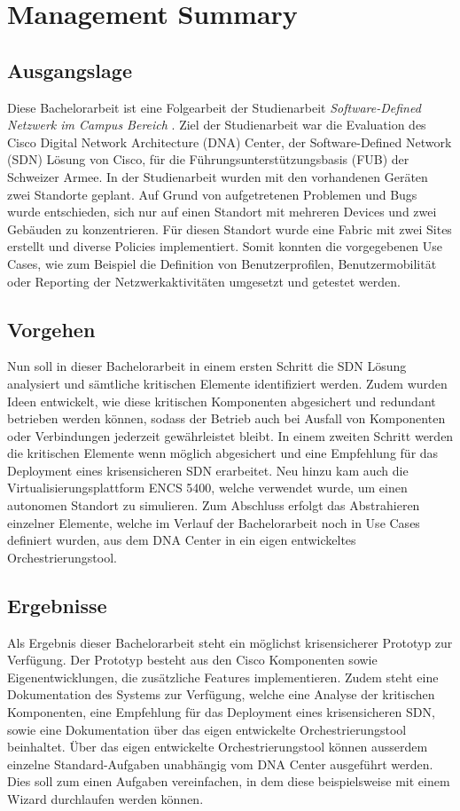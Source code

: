 \section{Management Summary}

\subsection{Ausgangslage}
Diese Bachelorarbeit ist eine Folgearbeit der Studienarbeit \textit{Software-Defined Netzwerk im Campus Bereich} \cite{studienarbeit}. Ziel der Studienarbeit war die Evaluation des Cisco Digital Network Architecture (DNA) Center, der Software-Defined Network (SDN) Lösung von Cisco, für die Führungsunterstützungsbasis (FUB) der Schweizer Armee. In der Studienarbeit wurden mit den vorhandenen Geräten zwei Standorte geplant. Auf Grund von aufgetretenen Problemen und Bugs wurde entschieden, sich nur auf einen Standort mit mehreren Devices und zwei Gebäuden zu konzentrieren. Für diesen Standort wurde eine Fabric mit zwei Sites erstellt und diverse Policies implementiert. Somit konnten die vorgegebenen Use Cases, wie zum Beispiel die Definition von Benutzerprofilen, Benutzermobilität oder Reporting der Netzwerkaktivitäten umgesetzt und getestet werden.

\subsection{Vorgehen}
Nun soll in dieser Bachelorarbeit in einem ersten Schritt die SDN Lösung analysiert und sämtliche kritischen Elemente identifiziert werden. Zudem wurden Ideen entwickelt, wie diese kritischen Komponenten abgesichert und redundant betrieben werden können, sodass der Betrieb auch bei Ausfall von Komponenten oder Verbindungen jederzeit ge\-währ\-leis\-tet bleibt. In einem zweiten Schritt werden die kritischen Elemente wenn möglich abgesichert und eine Empfehlung für das Deployment eines krisensicheren SDN erarbeitet. Neu hinzu kam auch die Virtualisierungsplattform ENCS 5400, welche verwendet wurde, um einen autonomen Standort zu simulieren. Zum Abschluss erfolgt das Abstrahieren einzelner Elemente, welche im Verlauf der Bachelorarbeit noch in Use Cases definiert wurden, aus dem DNA Center in ein eigen entwickeltes Orchestrierungstool. 

\subsection{Ergebnisse}
Als Ergebnis dieser Bachelorarbeit steht ein möglichst krisensicherer Prototyp zur Ver\-fü\-gung. Der Prototyp besteht aus den Cisco Komponenten sowie Eigenentwicklungen, die zu\-sätz\-liche Features implementieren. Zudem steht eine Dokumentation des Systems zur Verfügung, welche eine Analyse der kritischen Komponenten, eine Empfehlung für das Deployment eines krisensicheren SDN, sowie eine Dokumentation über das eigen entwickelte Or\-ches\-t\-rie\-rungstool beinhaltet. Über das eigen entwickelte Orchestrierungstool können ausserdem einzelne Standard-Aufgaben unabhängig vom DNA Center ausgeführt werden. Dies soll zum einen Aufgaben vereinfachen, in dem diese beispielsweise mit einem Wizard durchlaufen werden können. 
 
